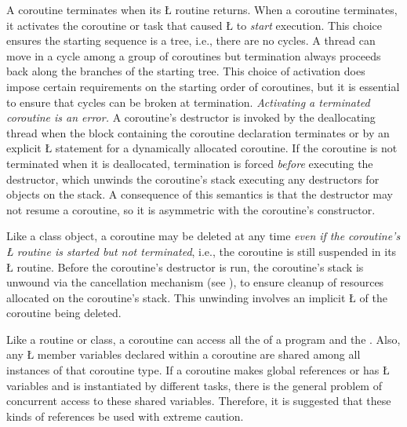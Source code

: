 \documentclass[openright,twoside]{report}
\begin{document}
A coroutine terminates when its \LGinlinetrue\LGbegin\lgrinde\L{}\endlgrinde\LGend{} routine returns.
When a coroutine terminates, it activates the coroutine or task that caused \LGinlinetrue\LGbegin\lgrinde\L{}\endlgrinde\LGend{} to \emph{start} execution.
This choice ensures the starting sequence is a tree, i.e., there are no cycles.
A thread can move in a cycle among a group of coroutines but termination always proceeds back along the branches of the starting tree.
This choice of activation does impose certain requirements on the starting order of coroutines, but it is essential to ensure that cycles can be broken at termination.
\emph{Activating a terminated coroutine is an error.}
A coroutine's destructor is invoked by the deallocating thread when the block containing the coroutine declaration terminates or by an explicit \LGinlinetrue\LGbegin\lgrinde\L{}\endlgrinde\LGend{} statement for a dynamically allocated coroutine.
If the coroutine is not terminated when it is deallocated, termination is forced \emph{before} executing the destructor, which unwinds the coroutine's stack executing any destructors for objects on the stack.
A consequence of this semantics is that the destructor may not resume a coroutine, so it is asymmetric with the coroutine's constructor.

Like\label{p:AutoUnwindCoroutine} a class object, a coroutine may be deleted at any time \emph{even if the coroutine's \LGinlinetrue\LGbegin\lgrinde\L{}\endlgrinde\LGend{} routine is started but not terminated}, i.e., the coroutine is still suspended in its \LGinlinetrue\LGbegin\lgrinde\L{}\endlgrinde\LGend{} routine.
Before the coroutine's destructor is run, the coroutine's stack is unwound via the cancellation mechanism (see ), to ensure cleanup of resources allocated on the coroutine's stack.
This unwinding involves an implicit \LGinlinetrue\LGbegin\lgrinde\L{}\endlgrinde\LGend{} of the coroutine being deleted. 

Like a routine or class, a coroutine can access all the  of a \CC program and the .
Also, any \LGinlinetrue\LGbegin\lgrinde\L{}\endlgrinde\LGend{} member variables declared within a coroutine are shared among all instances of that coroutine type.
If a coroutine makes global references or has \LGinlinetrue\LGbegin\lgrinde\L{}\endlgrinde\LGend{} variables and is instantiated by different tasks, there is the general problem of concurrent access to these shared variables.
Therefore, it is suggested that these kinds of references be used with extreme caution.
\end{document}
